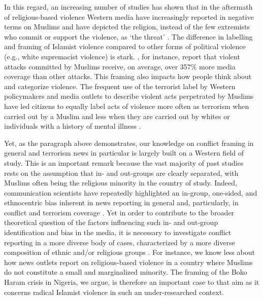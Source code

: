 In this regard, an increasing number of studies has shown that in the aftermath of religious-based violence Western media have increasingly reported in negative terms on Muslims and have depicted the religion, instead of the few extremists who commit or support the violence, as `the threat' \citep{Ahmed2017}. The difference in labelling and framing of Islamist violence compared to other forms of political violence (e.g., white supremacist violence) is stark. \cite{Kearns2019}, for instance, report that violent attacks committed by Muslims receive, on average, over 357\% more media coverage than other attacks. This framing also impacts how people think about and categorize violence. The frequent use of the terrorist label by Western policymakers and media outlets to describe violent acts perpetrated by Muslims have led citizens to equally label acts of violence more often as terrorism when carried out by a Muslim and less when they are carried out by whites or individuals with a history of mental illness \citep{DOrazio2018, Huff2018}.


Yet, as the paragraph above demonstrates, our knowledge on conflict framing in general and terrorism news in particular is largely built on a Western field of study. This is an important remark because the vast majority of past studies rests on the assumption that in- and out-groups are clearly separated, with Muslims often being the religious minority in the country of study. Indeed, communication scientists have repeatedly highlighted an in-group, one-sided, and ethnocentric bias inherent in news reporting in general \citep{Gans1980} and, particularly, in conflict and terrorism coverage \citep{Galtung1965, Wolfsfeld2008}. Yet in order to contribute to the broader theoretical question of the factors influencing such in- and out-group identification and bias in the media, it is necessary to investigate conflict reporting in a more diverse body of cases, characterized by a more diverse composition of ethnic and/or religious groups \citep[see also][p. 236-237]{Ahmed2017}. For instance, we know less about how news outlets report on religious-based violence in a country where Muslims do not constitute a small and marginalized minority. The framing of the Boko Haram crisis in Nigeria, we argue, is therefore an important case to that aim as it concerns radical Islamist violence in such an under-researched context.


